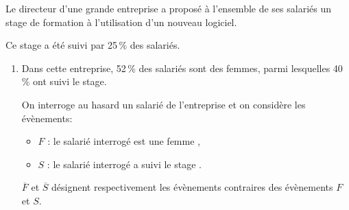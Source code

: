 \medskip

Le directeur d'une grande entreprise a proposé à l'ensemble de ses salariés un stage de formation à l'utilisation d'un nouveau logiciel.

Ce stage a été suivi par 25\,\% des salariés.

\medskip

\begin{enumerate}
\item Dans cette entreprise, 52\,\% des salariés sont des femmes, parmi lesquelles 
40\,\% ont suivi le stage.

On interroge au hasard un salarié de l'entreprise et on considère les évènements:

\setlength\parindent{1cm}
\begin{itemize}
\item[$\bullet~~$] $F$ : \og le salarié interrogé est une femme \fg,
\item[$\bullet~~$] $S$ : \og le salarié interrogé a suivi le stage \fg.
\end{itemize}
\setlength\parindent{0cm}

$\overline{F}$ et $\overline{S}$ désignent respectivement les évènements contraires des évènements $F$ et $S$.
\end{enumerate}

